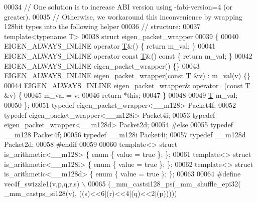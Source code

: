 \begin{DoxyCode}
00034 \textcolor{comment}{// One solution is to increase ABI version using -fabi-version=4 (or greater).}
00035 \textcolor{comment}{// Otherwise, we workaround this inconvenience by wrapping 128bit types into the following helper}
00036 \textcolor{comment}{// structure:}
00037 \textcolor{keyword}{template}<\textcolor{keyword}{typename} T>
00038 \textcolor{keyword}{struct }eigen\_packet\_wrapper
00039 \{
00040   EIGEN\_ALWAYS\_INLINE \textcolor{keyword}{operator} \hyperlink{group___sparse_core___module_class_eigen_1_1_triplet}{T}&() \{ \textcolor{keywordflow}{return} m\_val; \}
00041   EIGEN\_ALWAYS\_INLINE \textcolor{keyword}{operator} \textcolor{keyword}{const} \hyperlink{group___sparse_core___module_class_eigen_1_1_triplet}{T}&() \textcolor{keyword}{const} \{ \textcolor{keywordflow}{return} m\_val; \}
00042   EIGEN\_ALWAYS\_INLINE eigen\_packet\_wrapper() \{\}
00043   EIGEN\_ALWAYS\_INLINE eigen\_packet\_wrapper(\textcolor{keyword}{const} \hyperlink{group___sparse_core___module_class_eigen_1_1_triplet}{T} &v) : m\_val(v) \{\}
00044   EIGEN\_ALWAYS\_INLINE eigen\_packet\_wrapper& operator=(\textcolor{keyword}{const} \hyperlink{group___sparse_core___module_class_eigen_1_1_triplet}{T} &v) \{
00045     m\_val = v;
00046     \textcolor{keywordflow}{return} *\textcolor{keyword}{this};
00047   \}
00048   
00049   \hyperlink{group___sparse_core___module_class_eigen_1_1_triplet}{T} m\_val;
00050 \};
00051 \textcolor{keyword}{typedef} eigen\_packet\_wrapper<\_\_m128>  Packet4f;
00052 \textcolor{keyword}{typedef} eigen\_packet\_wrapper<\_\_m128i> Packet4i;
00053 \textcolor{keyword}{typedef} eigen\_packet\_wrapper<\_\_m128d> Packet2d;
00054 \textcolor{preprocessor}{#else}
00055 \textcolor{keyword}{typedef} \_\_m128  Packet4f;
00056 \textcolor{keyword}{typedef} \_\_m128i Packet4i;
00057 \textcolor{keyword}{typedef} \_\_m128d Packet2d;
00058 \textcolor{preprocessor}{#endif}
00059 
00060 \textcolor{keyword}{template}<> \textcolor{keyword}{struct }is\_arithmetic<\_\_m128>  \{ \textcolor{keyword}{enum} \{ value = \textcolor{keyword}{true} \}; \};
00061 \textcolor{keyword}{template}<> \textcolor{keyword}{struct }is\_arithmetic<\_\_m128i> \{ \textcolor{keyword}{enum} \{ value = \textcolor{keyword}{true} \}; \};
00062 \textcolor{keyword}{template}<> \textcolor{keyword}{struct }is\_arithmetic<\_\_m128d> \{ \textcolor{keyword}{enum} \{ value = \textcolor{keyword}{true} \}; \};
00063 
00064 \textcolor{preprocessor}{#define vec4f\_swizzle1(v,p,q,r,s) \(\backslash\)}
00065 \textcolor{preprocessor}{  (\_mm\_castsi128\_ps(\_mm\_shuffle\_epi32( \_mm\_castps\_si128(v), ((s)<<6|(r)<<4|(q)<<2|(p)))))}

\end{DoxyCode}
